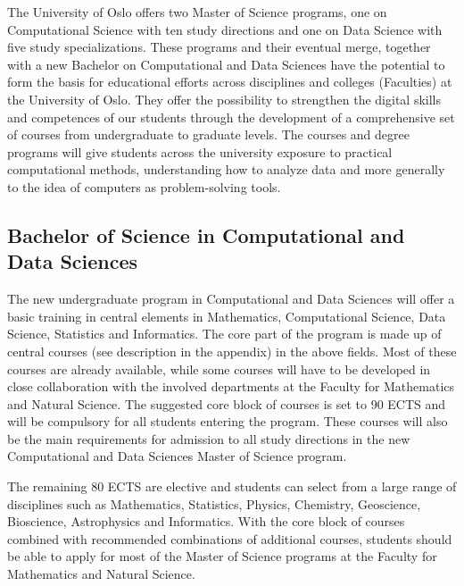 \documentclass[oneside,final,10pt]{article}
\begin{document}
The University of Oslo offers two Master of Science programs, one on Computational Science with ten study directions and one on Data Science with five study specializations.
These programs and their eventual merge, together with a new Bachelor on Computational and Data Sciences have the potential to  form the basis for  educational efforts  across disciplines and colleges (Faculties) at the University of Oslo. They offer the possibility to  strengthen  the digital skills and competences of our students through the development of a comprehensive set of courses from undergraduate to graduate levels. The courses and degree programs will give students across the university exposure to practical computational methods, understanding how to analyze data and more generally to the idea of computers as problem-solving tools.  
 

\subsection*{Bachelor of Science in Computational and Data Sciences}

The new undergraduate program in Computational and Data Sciences will offer a basic training in central elements in Mathematics, Computational Science, Data Science, Statistics and Informatics. 
The core part of the program is made up of central courses (see description in the appendix) in the above fields. Most of these courses are already available, while some courses will have to be developed in close collaboration with the involved departments at the Faculty for Mathematics and Natural Science.
The suggested core block of courses is set to 90 ECTS and will be compulsory for all students entering the program. These courses will also be the main requirements for admission to
 all study directions in the new Computational and Data Sciences Master of Science program.


The remaining 80 ECTS are elective and students can select from a large range of disciplines such as Mathematics, Statistics, Physics, Chemistry, Geoscience, Bioscience, Astrophysics and Informatics. 
With the core block of courses combined with recommended combinations of additional courses,  students should be able to apply for most of the Master of Science programs at the Faculty for Mathematics and Natural Science. 
\end{document}
